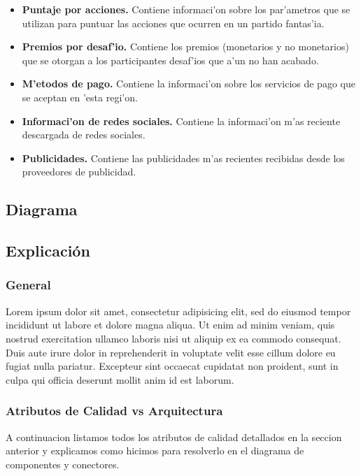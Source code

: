 \begin{itemize}
	\item \textbf{Puntaje por acciones.} Contiene informaci'on sobre los par'ametros que se utilizan para puntuar las acciones que ocurren en un partido fantas'ia.
	\item \textbf{Premios por desaf'io.} Contiene los premios (monetarios y no monetarios) que se otorgan a los participantes desaf'ios que a'un no han acabado.
	\item \textbf{M'etodos de pago.} Contiene la informaci'on sobre los servicios de pago que se aceptan en 'esta regi'on.
	\item \textbf{Informaci'on de redes sociales.} Contiene la informaci'on m'as reciente descargada de redes sociales.
	\item \textbf{Publicidades.} Contiene las publicidades m'as recientes recibidas desde los proveedores de publicidad.
\end{itemize}

\subsection{Diagrama}
\subsection{Explicación}
\subsubsection{General}
Lorem ipsum dolor sit amet, consectetur adipisicing elit, sed do eiusmod
tempor incididunt ut labore et dolore magna aliqua. Ut enim ad minim veniam,
quis nostrud exercitation ullamco laboris nisi ut aliquip ex ea commodo
consequat. Duis aute irure dolor in reprehenderit in voluptate velit esse
cillum dolore eu fugiat nulla pariatur. Excepteur sint occaecat cupidatat non
proident, sunt in culpa qui officia deserunt mollit anim id est laborum.

\subsubsection{Atributos de Calidad vs Arquitectura}
A continuacion listamos todos los atributos de calidad detallados en la seccion anterior y explicamos como hicimos para resolverlo en el diagrama de componentes y conectores.

